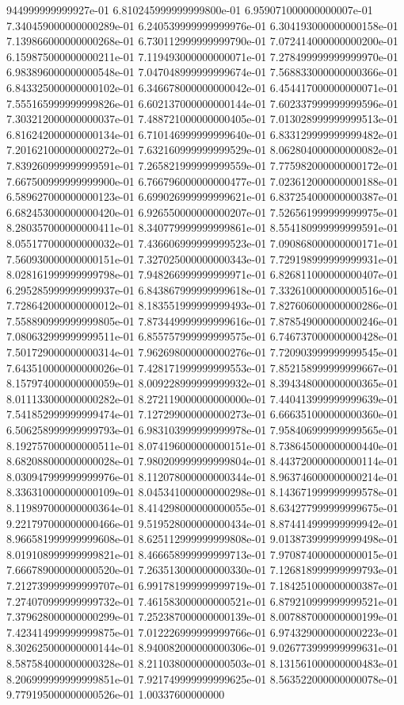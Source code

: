 944999999999927e-01	6.810245999999999800e-01	6.959071000000000007e-01	7.340459000000000289e-01	6.240539999999999976e-01	6.304193000000000158e-01	7.139866000000000268e-01	6.730112999999999790e-01	7.072414000000000200e-01	6.159875000000000211e-01	7.119493000000000071e-01	7.278499999999999970e-01	6.983896000000000548e-01	7.047048999999999674e-01	7.568833000000000366e-01	6.843325000000000102e-01	6.346678000000000042e-01	6.454417000000000071e-01	7.555165999999999826e-01	6.602137000000000144e-01	7.602337999999999596e-01	7.303212000000000037e-01	7.488721000000000405e-01	7.013028999999999513e-01	6.816242000000000134e-01	6.710146999999999640e-01	6.833129999999999482e-01	7.201621000000000272e-01	7.632160999999999529e-01	8.062804000000000082e-01	7.839260999999999591e-01	7.265821999999999559e-01	7.775982000000000172e-01	7.667500999999999900e-01	6.766796000000000477e-01	7.023612000000000188e-01	6.589627000000000123e-01	6.699026999999999621e-01	6.837254000000000387e-01	6.682453000000000420e-01	6.926550000000000207e-01	7.526561999999999975e-01	8.280357000000000411e-01	8.340779999999999861e-01	8.554180999999999591e-01	8.055177000000000032e-01	7.436606999999999523e-01	7.090868000000000171e-01	7.560930000000000151e-01	7.327025000000000343e-01	7.729198999999999931e-01	8.028161999999999798e-01	7.948266999999999971e-01	6.826811000000000407e-01	6.295285999999999937e-01	6.843867999999999618e-01	7.332610000000000516e-01	7.728642000000000012e-01	8.183551999999999493e-01	7.827606000000000286e-01	7.558890999999999805e-01	7.873449999999999616e-01	7.878549000000000246e-01	7.080632999999999511e-01	6.855757999999999575e-01	6.746737000000000428e-01	7.501729000000000314e-01	7.962698000000000276e-01	7.720903999999999545e-01	7.643510000000000026e-01	7.428171999999999553e-01	7.852158999999999667e-01	8.157974000000000059e-01	8.009228999999999932e-01	8.394348000000000365e-01	8.011133000000000282e-01	8.272119000000000000e-01	7.440413999999999639e-01	7.541852999999999474e-01	7.127299000000000273e-01	6.666351000000000360e-01	6.506258999999999793e-01	6.983103999999999978e-01	7.958406999999999565e-01	8.192757000000000511e-01	8.074196000000000151e-01	8.738645000000000440e-01	8.682088000000000028e-01	7.980209999999999804e-01	8.443720000000000114e-01	8.030947999999999976e-01	8.112078000000000344e-01	8.963746000000000214e-01	8.336310000000000109e-01	8.045341000000000298e-01	8.143671999999999578e-01	8.119897000000000364e-01	8.414298000000000055e-01	8.634277999999999675e-01	9.221797000000000466e-01	9.519528000000000434e-01	8.874414999999999942e-01	8.966581999999999608e-01	8.625112999999999808e-01	9.013873999999999498e-01	8.019108999999999821e-01	8.466658999999999713e-01	7.970874000000000015e-01	7.666789000000000520e-01	7.263513000000000330e-01	7.126818999999999793e-01	7.212739999999999707e-01	6.991781999999999719e-01	7.184251000000000387e-01	7.274070999999999732e-01	7.461583000000000521e-01	6.879210999999999521e-01	7.379628000000000299e-01	7.252387000000000139e-01	8.007887000000000199e-01	7.423414999999999875e-01	7.012226999999999766e-01	6.974329000000000223e-01	8.302625000000000144e-01	8.940082000000000306e-01	9.026773999999999631e-01	8.587584000000000328e-01	8.211038000000000503e-01	8.131561000000000483e-01	8.206999999999999851e-01	7.921749999999999625e-01	8.563522000000000078e-01	9.779195000000000526e-01	1.00337600000000